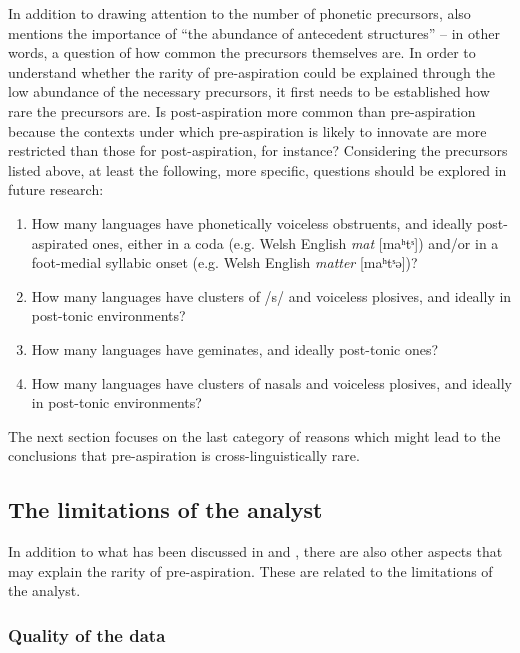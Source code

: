 \documentclass[output=paper]{langscibook}
\begin{document}
In addition to drawing attention to the number of phonetic precursors, \citet[70]{Clayton2010} also mentions the importance of “the abundance of antecedent structures” – in other words, a question of how common the precursors themselves are. In order to understand whether the rarity of pre\hyp aspiration could be explained through the low abundance of the necessary precursors, it first needs to be established how rare the precursors are. Is post-aspiration more common than pre\hyp aspiration because the contexts under which pre\hyp aspiration is likely to innovate are more restricted than those for post-aspiration, for instance? Considering the precursors listed above, at least the following, more specific, questions should be explored in future research:

\begin{enumerate}
\item How many languages have phonetically voiceless obstruents, and ideally post-aspirated ones, either in a coda (e.g. Welsh English \textit{mat} [maʰtˢ]) and/or in a foot-medial syllabic onset (e.g. Welsh English \textit{matter} [maʰtˢə])?
\item How many languages have clusters of /s/ and voiceless plosives, and ideally in post-tonic environments?
\item How many languages have geminates, and ideally post-tonic ones?
\item How many languages have clusters of nasals and voiceless plosives, and ideally in post-tonic environments?
\end{enumerate}

The next section focuses on the last category of reasons which might lead to the conclusions that pre\hyp aspiration is cross-linguistically rare.

\subsection{The limitations of the analyst}\label{sec:hejna:4.3}

In addition to what has been discussed in  and , there are also other aspects that may explain the rarity of pre-aspiration. These are related to the limitations of the analyst.

\subsubsection{Quality of the data}
\end{document}
